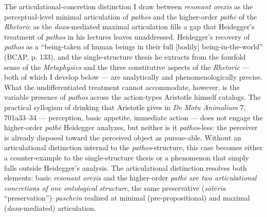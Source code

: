 The articulational-concretion distinction I draw between \textit{resonant orexis} as the perceptual-level minimal articulation of \textit{pathos} and the higher-order \textit{pathē} of the \textit{Rhetoric} as the \textit{doxa}-mediated maximal articulation fills a gap that Heidegger's treatment of \textit{pathos} in his lectures leaves unaddressed. Heidegger's recovery of \textit{pathos} as a ``being-taken of human beings in their full [bodily] being-in-the-world'' (BCAP, p. 133), and the single-structure thesis he extracts from the fourfold sense of the \textit{Metaphysics} and the three constitutive aspects of the \textit{Rhetoric} --- both of which I develop below --- are analytically and phenomenologically precise. What the undifferentiated treatment cannot accommodate, however, is the variable presence of \textit{pathos} across the action-types Aristotle himself catalogs. The practical syllogism of drinking that Aristotle gives in \textit{De Motu Animalium} 7, 701a33--34 --- perception, basic appetite, immediate action --- does not engage the higher-order \textit{pathē} Heidegger analyzes, but neither is it \textit{pathos}-less: the perceiver is already disposed toward the perceived object as pursue-able. Without an articulational distinction internal to the \textit{pathos}-structure, this case becomes either a counter-example to the single-structure thesis or a phenomenon that simply falls outside Heidegger's analysis. The articulational distinction resolves both elements: basic \textit{resonant orexis} and the higher-order \textit{pathē} are \textit{two articulational concretions of one ontological structure}, the same preservative  (\textit{sōtēria} ``preservation'')--\textit{paschein} realized at minimal (pre-propositional) and maximal (\textit{doxa}-mediated) articulation.

